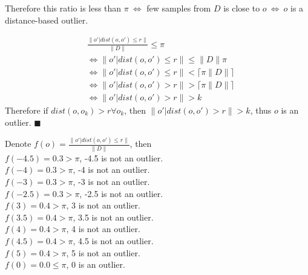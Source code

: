 \documentclass[11pt]{article}%
\begin{document}
\begin{questions}[start=2]
{\begin{questions}
            Therefore this ratio is less than $\pi\ \Leftrightarrow$ few samples from $D$
            is close to $o\ \Leftrightarrow\ o$ is a distance-based outlier.
            \item \begin{align*}
                 & \frac{\|o'|dist(o,o')\leq r\|}{\|D\|} \leq \pi                  \\
                 & \Leftrightarrow \|o'|dist(o,o')\leq r\| \leq \|D\| \pi          \\
                 & \Leftrightarrow \|o'|dist(o,o')\leq r\| < \lceil\pi\|D\| \rceil \\
                 & \Leftrightarrow \|o'|dist(o,o')> r\| > \lceil\pi\|D\| \rceil    \\
                 & \Leftrightarrow \|o'|dist(o,o')> r\| > k
            \end{align*}
            Therefore if $dist(o, o_k)>r\forall o_k$, then $\|o'|dist(o,o')> r\| > k$, thus $o$ is an outlier.
            $\blacksquare$
            \item Denote $f(o)=\frac{\|o'|dist(o,o')\leq r\|}{\|D\|}$, then\\
            $f(-4.5)=0.3> \pi$, -4.5 is not an outlier.\\
            $f(-4)=0.3> \pi$, -4 is not an outlier.\\
            $f(-3)=0.3> \pi$, -3 is not an outlier.\\
            $f(-2.5)=0.3> \pi$, -2.5 is not an outlier.\\
            $f(3)=0.4> \pi$, 3 is not an outlier.\\
            $f(3.5)=0.4> \pi$, 3.5 is not an outlier.\\
            $f(4)=0.4> \pi$, 4 is not an outlier.\\
            $f(4.5)=0.4> \pi$, 4.5 is not an outlier.\\
            $f(5)=0.4> \pi$, 5 is not an outlier.\\

            $f(0)=0.0\leq \pi$, 0 is an outlier.\\
        \end{questions}
    }
\end{questions}
\pagebreak
\begin{questions}[start=3]
    \item {}
\end{questions}
\pagebreak
\end{document}

